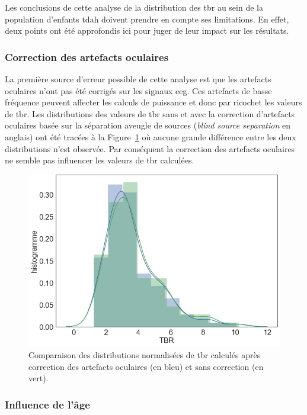 Les conclusions de cette analyse de la distribution des \gls{tbr} au sein de la population d'enfants \gls{tdah} doivent prendre en compte ses limitations.
En effet, deux points ont été approfondis ici pour juger de leur impact sur les résultats.

\subsubsection{Correction des artefacts oculaires}

La première source d'erreur possible de cette analyse est que les artefacts oculaires n'ont pas été corrigés sur les signaux \gls{eeg}. Ces artefacts de basse fréquence
peuvent affecter les calculs de puissance et donc par ricochet les valeurs de \gls{tbr}. Les distributions des valeurs de \gls{tbr} sans et avec 
la correction d'artefacts oculaires basée sur la séparation aveugle de sources (\textit{blind source separation} en anglais) \citep{Barthelemy2017} 
ont été tracées à la Figure~\ref{Figure:tbr_eye_artifact_correction} où aucune grande différence entre les deux distributions n'est observée.
Par conséquent la correction des artefacts oculaires ne semble pas influencer les valeurs de \gls{tbr} calculées.

\begin{figure}[h!]
  \centering
	\includegraphics[width=0.5\linewidth]{figures/chapter-4/tbr-eye-artifact-correction} 
  \caption{Comparaison des distributions normalisées de \gls{tbr} calculés après correction des artefacts oculaires (en bleu) et sans correction (en vert).}
  \label{Figure:tbr_eye_artifact_correction}
\end{figure}

\subsubsection{Influence de l'âge}

